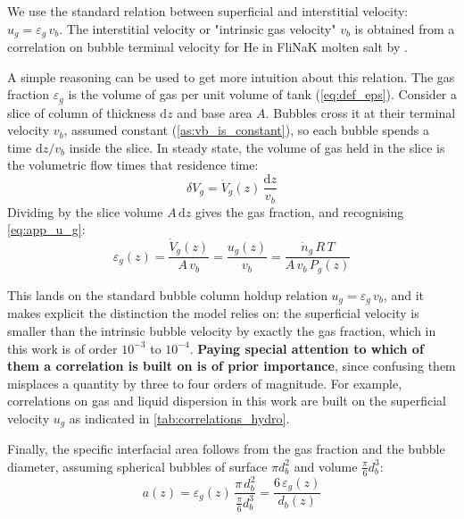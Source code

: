 \documentclass[a4paper,11pt,oneside]{report}
\begin{document}
We use the standard relation between superficial and interstitial velocity: $u_g = \varepsilon_g\,v_b$. The interstitial velocity or "intrinsic gas velocity" $v_b$ is obtained from a correlation on bubble terminal velocity for He in FliNaK molten salt by \textcite{chavez_experimental_2021}.

A simple reasoning can be used to get more intuition about this relation. The gas fraction $\varepsilon_g$ is the volume of gas per unit volume of tank (\cref{eq:def_eps}). Consider a slice of column of thickness $\mathrm{d}z$ and base area $A$. Bubbles cross it at their terminal velocity $v_b$, assumed constant (\cref{as:vb_is_constant}), so each bubble spends a time $\mathrm{d}z/v_b$ inside the slice. In steady state, the volume of gas held in the slice is the volumetric flow times that residence time:
\begin{equation}
    \delta V_g = \dot V_g(z)\,\frac{\mathrm{d}z}{v_b}
\end{equation}
Dividing by the slice volume $A\,\mathrm{d}z$ gives the gas fraction, and recognising \cref{eq:app_u_g}:
\begin{equation}
\label{eq:app_eps_g}
    \boxed{\varepsilon_g(z) = \frac{\dot V_g(z)}{A\,v_b} = \frac{u_g(z)}{v_b}
    = \frac{\dot n_g\,R\,T}{A\,v_b\,P_g(z)}}
\end{equation}

This lands on the standard bubble column holdup relation $u_g = \varepsilon_g\,v_b$, and it makes explicit the distinction the model relies on: the superficial velocity is smaller than the intrinsic bubble velocity by exactly the gas fraction, which in this work is of order $10^{-3}$ to $10^{-4}$. \textbf{Paying special attention to which of them a correlation is built on is of prior importance}, since confusing them misplaces a quantity by three to four orders of magnitude. For example, correlations on gas and liquid dispersion in this work are built on the superficial velocity $u_g$ as indicated in \cref{tab:correlations_hydro}.

Finally, the specific interfacial area follows from the gas fraction and the bubble diameter, assuming spherical bubbles of surface $\pi d_b^2$ and volume $\frac{\pi}{6}d_b^3$:
\begin{equation}
    a(z) = \varepsilon_g(z)\,\frac{\pi\,d_b^2}{\frac{\pi}{6}d_b^3}
         = \frac{6\,\varepsilon_g(z)}{d_b(z)}
\end{equation}
\end{document}
